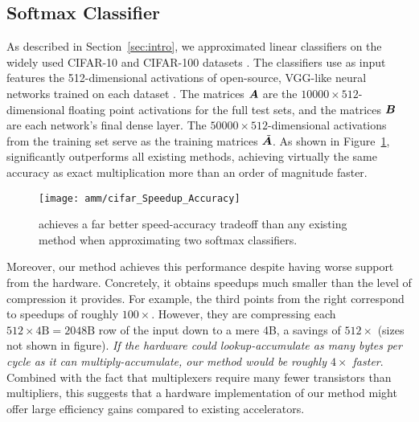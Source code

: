 \subsection{Softmax Classifier}

As described in Section~\ref{sec:intro}, we approximated linear classifiers on the widely used CIFAR-10 and CIFAR-100 datasets \cite{cifarDsets}. The classifiers use as input features the 512-dimensional activations of open-source, VGG-like neural networks trained on each dataset \cite{cifarVgg}. The matrices $\bm{A}$ are the $10000 \times 512$-dimensional floating point activations for the full test sets, and the matrices $\bm{B}$ are each network's final dense layer. The $50000 \times 512$-dimensional activations from the training set serve as the training matrices $\tilde{\bm{A}}$.
As shown in Figure~\ref{fig:cifar}, \oursp significantly outperforms all existing methods, achieving virtually the same accuracy as exact multiplication more than an order of magnitude faster.

\begin{figure}[h]
\begin{center}
\texttt{[image: amm/cifar\_Speedup\_Accuracy]}
\caption{\oursp achieves a far better speed-accuracy tradeoff than any existing method when approximating two softmax classifiers.}
\label{fig:cifar}
\end{center}
\end{figure}

Moreover, our method achieves this performance despite having worse support from the hardware. Concretely, it obtains speedups much smaller than the level of compression it provides. For example, the third points from the right correspond to speedups of roughly $100\times$. However, they are compressing each $512 \times 4\text{B} = 2048\text{B}$ row of the input down to a mere 4B, a savings of $512\times$ (sizes not shown in figure). \textit{If the hardware could lookup-accumulate as many bytes per cycle as it can multiply-accumulate, our method would be roughly $4\times$ faster}. Combined with the fact that multiplexers require many fewer transistors than multipliers, this suggests that a hardware implementation of our method might offer large efficiency gains compared to existing accelerators.

